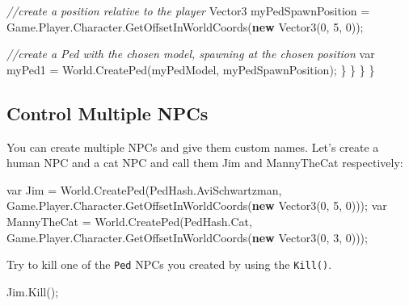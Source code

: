 \documentclass[
  openany]{book}
\newenvironment{Shaded}{\begin{snugshade}}{\end{snugshade}}
\newcommand{\CommentTok}[1]{\textcolor[rgb]{0.56,0.35,0.01}{\textit{#1}}}
\newcommand{\DataTypeTok}[1]{\textcolor[rgb]{0.13,0.29,0.53}{#1}}
\newcommand{\DecValTok}[1]{\textcolor[rgb]{0.00,0.00,0.81}{#1}}
\newcommand{\FunctionTok}[1]{\textcolor[rgb]{0.00,0.00,0.00}{#1}}
\newcommand{\KeywordTok}[1]{\textcolor[rgb]{0.13,0.29,0.53}{\textbf{#1}}}
\newcommand{\NormalTok}[1]{#1}
\begin{document}
\begin{Shaded}
\begin{Highlighting}[]
        \CommentTok{//create a position relative to the player}
\NormalTok{        Vector3 myPedSpawnPosition = Game.}\FunctionTok{Player}\NormalTok{.}\FunctionTok{Character}\NormalTok{.}\FunctionTok{GetOffsetInWorldCoords}\NormalTok{(}\KeywordTok{new} \FunctionTok{Vector3}\NormalTok{(}\DecValTok{0}\NormalTok{, }\DecValTok{5}\NormalTok{, }\DecValTok{0}\NormalTok{));}
    
        \CommentTok{//create a Ped with the chosen model, spawning at the chosen position}
        \DataTypeTok{var}\NormalTok{ myPed1 = World.}\FunctionTok{CreatePed}\NormalTok{(myPedModel, myPedSpawnPosition); }
\NormalTok{            \}}
\NormalTok{        \}}
\NormalTok{    \}}
\NormalTok{\}}
\end{Highlighting}
\end{Shaded}

\hypertarget{control-multiple-npcs}{%
\subsection*{Control Multiple NPCs}\label{control-multiple-npcs}}

You can create multiple NPCs and give them custom names. Let's create a human NPC and a cat NPC and call them Jim and MannyTheCat respectively:

\begin{Shaded}
\begin{Highlighting}[]
\DataTypeTok{var}\NormalTok{ Jim = World.}\FunctionTok{CreatePed}\NormalTok{(PedHash.}\FunctionTok{AviSchwartzman}\NormalTok{, Game.}\FunctionTok{Player}\NormalTok{.}\FunctionTok{Character}\NormalTok{.}\FunctionTok{GetOffsetInWorldCoords}\NormalTok{(}\KeywordTok{new} \FunctionTok{Vector3}\NormalTok{(}\DecValTok{0}\NormalTok{, }\DecValTok{5}\NormalTok{, }\DecValTok{0}\NormalTok{)));}
\DataTypeTok{var}\NormalTok{ MannyTheCat = World.}\FunctionTok{CreatePed}\NormalTok{(PedHash.}\FunctionTok{Cat}\NormalTok{, Game.}\FunctionTok{Player}\NormalTok{.}\FunctionTok{Character}\NormalTok{.}\FunctionTok{GetOffsetInWorldCoords}\NormalTok{(}\KeywordTok{new} \FunctionTok{Vector3}\NormalTok{(}\DecValTok{0}\NormalTok{, }\DecValTok{3}\NormalTok{, }\DecValTok{0}\NormalTok{)));}
\end{Highlighting}
\end{Shaded}

Try to kill one of the \texttt{Ped} NPCs you created by using the \texttt{Kill()}.

\begin{Shaded}
\begin{Highlighting}[]
\NormalTok{Jim.}\FunctionTok{Kill}\NormalTok{();}
\end{Highlighting}
\end{Shaded}
\end{document}
